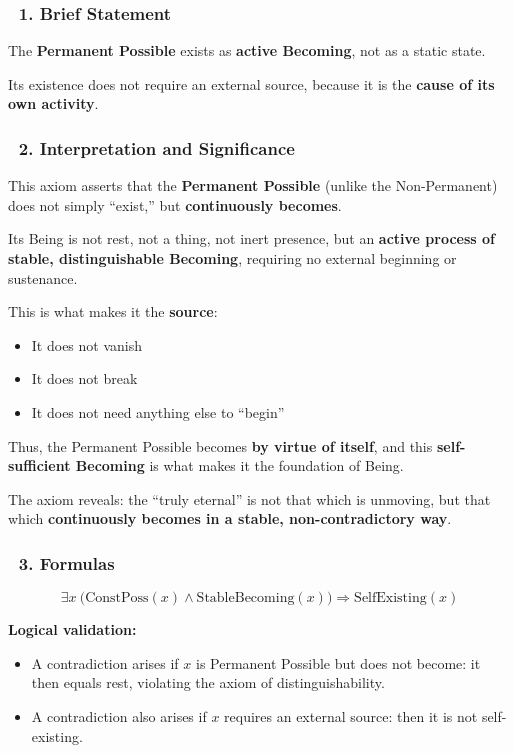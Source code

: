 \documentclass[12pt]{article}
\begin{document}
\subsubsection*{🔹 1. Brief Statement}
The \textbf{Permanent Possible} exists as \textbf{active Becoming}, not as a static state.

Its existence does not require an external source, because it is the \textbf{cause of its own activity}.

\subsubsection*{🔹 2. Interpretation and Significance}
This axiom asserts that the \textbf{Permanent Possible} (unlike the Non-Permanent) does not simply ``exist,'' but \textbf{continuously becomes}.

Its Being is not rest, not a thing, not inert presence, but an \textbf{active process of stable, distinguishable Becoming}, requiring no external beginning or sustenance.

\bigskip
This is what makes it the \textbf{source}:
\begin{itemize}
\item It does not vanish
\item It does not break
\item It does not need anything else to ``begin''
\end{itemize}

Thus, the Permanent Possible becomes \textbf{by virtue of itself}, and this \textbf{self-sufficient Becoming} is what makes it the foundation of Being.

\bigskip
The axiom reveals: the ``truly eternal'' is not that which is unmoving, but that which \textbf{continuously becomes in a stable, non-contradictory way}.

\subsubsection*{🔹 3. Formulas}
\[
\exists x\ \bigl(\text{ConstPoss}(x) \wedge \text{StableBecoming}(x)\bigr) \Rightarrow \text{SelfExisting}(x)
\]

\bigskip
\textbf{Logical validation:}

\begin{itemize}
\item A contradiction arises if $x$ is Permanent Possible but does not become: it then equals rest, violating the axiom of distinguishability.
\item A contradiction also arises if $x$ requires an external source: then it is not self-existing.
\end{itemize}
\end{document}
